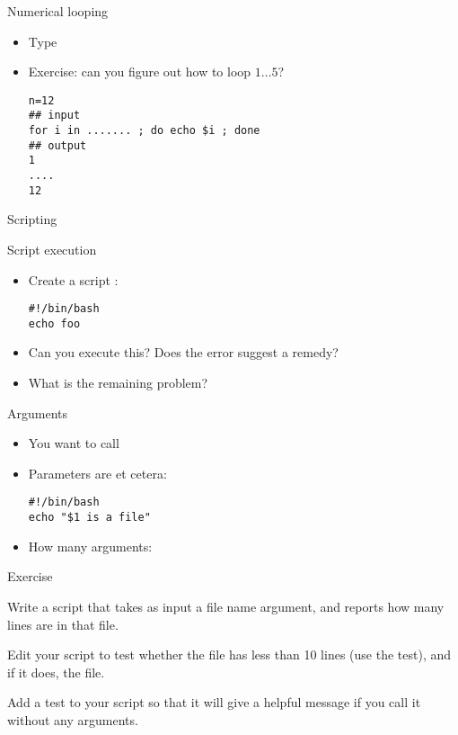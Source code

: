\documentclass[11pt,headernav]{beamer}
\begin{document}
\begin{numberedframe}{Numerical looping}

  \begin{itemize}
  \item Type 
  \item Exercise: can you figure out how to loop $1\ldots5$?
\begin{verbatim}
n=12
## input
for i in ....... ; do echo $i ; done
## output
1
....
12
\end{verbatim}
  \end{itemize}
\end{numberedframe}

 {Scripting}

\begin{numberedframe}{Script execution}
  \label{sl-lnx:script}
  \begin{itemize}
  \item Create a script :
\begin{verbatim}
#!/bin/bash
echo foo
\end{verbatim}
\item Can you execute this? Does the error suggest a remedy?
\item What is the remaining problem?
  \end{itemize}
\end{numberedframe}

\begin{numberedframe}{Arguments}

  \begin{itemize}
  \item You want to call 
    \item Parameters are  et cetera:
\begin{verbatim}
#!/bin/bash
echo "$1 is a file"
\end{verbatim}
\item How many arguments: \n{$#}
  \end{itemize}
\end{numberedframe}

\begin{numberedframe}{Exercise}

  Write a script that takes as input a file name argument, and reports how many
  lines are in that file.

  Edit your script to test whether the file has less than 10 lines
  (use the  test), and if it does,  the
  file. 

  Add a
  test to your script so that it will give a helpful message if you call
  it without any arguments.

\end{numberedframe}
\end{document}
